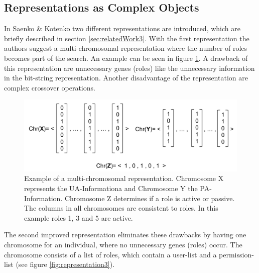         \subsection{Representations as Complex Objects}
        In Saenko \& Kotenko\cite{saenko2012design} two different representations are introduced, which are briefly described in section \ref{sec:relatedWork3}. With the first representation the authors suggest a multi-chromosomal representation where the number of roles becomes part of the search. An example can be seen in figure \ref{fig:representation2}. A drawback of this representation are unnecessary genes (roles) like the unnecessary information in the bit-string representation. Another disadvantage of the representation are complex crossover operations\cite{saenko2012design}.
        \begin{figure}[H]
            \centering
            \includegraphics[scale=0.5]{./Figures/ComplexRepresentation1}
            \caption{Example of a multi-chromosomal representation. Chromosome X represents the UA-Informationa and Chromosome Y the PA-Information. Chromosome Z determines if a role is active or passive. The columns in all chromosomes are consistent to roles. In this example roles 1, 3 and 5 are active.}
            \label{fig:representation2}
        \end{figure}
        The second improved representation eliminates these drawbacks by having one chromosome for an individual, where no unnecessary genes (roles) occur. The chromosome consists of a list of roles, which contain a user-list and a permission-list (see figure \ref{fig:representation3}).\\
